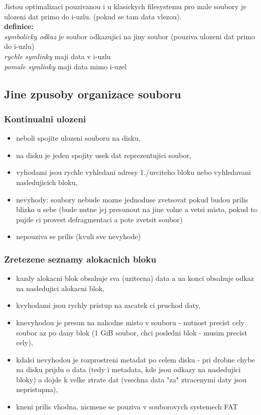 \documentclass[a4paper, 11pt]{article}
\begin{document}
Jistou optimalizaci pouzivanou i u klasickych filesystemu pro male soubory je ulozeni dat primo do i-uzlu. (pokud se tam data vlezou). \\

\textbf{definice:} \\[0.5em]
\textit{symbolicky odkaz} je soubor odkazujici na jiny soubor (pouziva ulozeni dat primo do i-uzlu) \\[0.2em]
\textit{rychle symlinky} maji data v i-uzlu \\[0.2em]
\textit{pomale symlinky} maji data mimo i-uzel

\newpage

\subsection{Jine zpusoby organizace souboru}
\subsubsection{Kontinualni ulozeni}
\begin{itemize}
    \item neboli spojite ulozeni souboru na disku,
    \item na disku je jeden spojity usek dat reprezentujici soubor,
    \item vyhodami jsou rychle vyhledani adresy 1./urciteho bloku nebo vyhledavani nasledujicich bloku,
    \item nevyhody: soubory nebude mozne jednoduse zvetsovat pokud budou prilis blizko u sebe (bude nutne jej presunout na jine volne a vetsi misto, pokud to pujde ci provest defragmentaci a pote zvetsit soubor)
    \item nepouziva se prilis (kvuli sve nevyhode) \\
\end{itemize}

\subsubsection{Zretezene seznamy alokacnich bloku}
\begin{itemize}
    \item kazdy alokacni blok obsahuje sva (uzitecna) data a na konci obsahuje odkaz na nasledujici alokacni blok,
    \item kvyhodami jsou rychly pristup na zacatek ci pruchod daty,
    \item knevyhodou je presun na nahodne misto v souboru - nutnost precist cely soubor az po dany blok (1 GiB soubor, chci posledni blok - musim precist cely),
    \item kdalsi nevyhodou je rozprostreni metadat po celem disku - pri drobne chybe na disku prijdu o data (tedy i metadata, kde jsou odkazy na nasledujici bloky) a dojde k velke ztrate dat (vsechna data "za" ztracenymi daty jsou nepristupna),
    \item kneni prilis vhodna, nicmene se pouziva v souborovych systemech FAT \\
\end{itemize}
\end{document}
